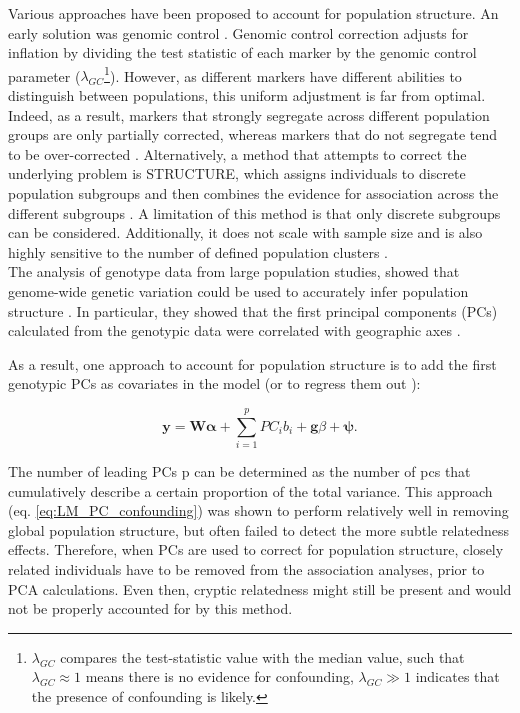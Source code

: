 Various approaches have been proposed to account for population structure.
An early solution was genomic control \cite{devlin1999genomic}.
Genomic control correction adjusts for inflation by dividing the test statistic of each marker by the genomic control parameter ($\lambda_{GC}$\footnote{$\lambda_{GC}$ compares the test-statistic value with the median value, such that $\lambda_{GC} \approx 1$ means there is no evidence for confounding, $\lambda_{GC} \gg 1$ indicates that the presence of confounding is likely.}). 
However, as different markers have different abilities to distinguish between populations, this uniform adjustment is far from optimal. 
Indeed, as a result, markers that strongly segregate across different population groups are only partially corrected, whereas markers that do not segregate tend to be over-corrected \cite{marchini2004effects, price2006principal}.
Alternatively, a method that attempts to correct the underlying problem is STRUCTURE, which assigns individuals to discrete population subgroups and then combines the evidence for association across the different subgroups \cite{pritchard2000inference}. 
A limitation of this method is that only discrete subgroups can be considered. 
Additionally, it does not scale with sample size and is also highly sensitive to the number of defined population clusters \cite{price2006principal}.\\

The analysis of genotype data from large population studies, showed that genome-wide genetic variation could be used to
accurately infer population structure 
\cite{li2008worldwide, tian2008analysis, price2008discerning}.
In particular, they showed that the first principal components (PCs) calculated from the genotypic data were correlated with geographic axes \cite{novembre2008interpreting}.

As a result, one approach to account for population structure is to add the first genotypic PCs as covariates in the model (or to regress them out \cite{price2006principal}): 

\begin{equation}\label{eq:LM_PC_confounding}
    \mathbf{y} =  \mathbf{W}\boldsymbol{\alpha} + \sum_{i=1}^{p} PC_i b_i + \mathbf{g}\beta + \boldsymbol{\psi}. 
\end{equation}

The number of leading PCs p can be determined as the number of \gls{pc}s that cumulatively describe a certain proportion of the total variance.
This approach (eq. \eqref{eq:LM_PC_confounding}) was shown to perform relatively well in removing global population structure, but often failed to detect the more subtle relatedness effects.
Therefore, when PCs are used to correct for population structure, closely related individuals have to be removed from the association analyses, prior to PCA calculations.
Even then, cryptic relatedness might still be present and would not be properly accounted for by this method. 

